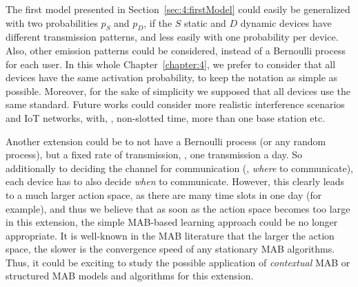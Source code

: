 The first model presented in Section~\ref{sec:4:firstModel} could easily be generalized with two probabilities $p_S$ and $p_D$, if the $S$ static and $D$ dynamic devices have different transmission patterns, and less easily with one probability per device.
Also, other emission patterns could be considered, instead of a Bernoulli process for each user.
In this whole Chapter~\ref{chapter:4}, we prefer to consider that all devices have the same activation probability, to keep the notation as simple as possible.
%
Moreover, for the sake of simplicity we supposed that all devices use the same standard.
Future works could consider more realistic interference scenarios and IoT networks, with, \eg, non-slotted time, more than one base station etc.

Another extension could be to not have a Bernoulli process (or any random process), but a fixed rate of transmission, \eg, one transmission a day.
So additionally to deciding the channel for communication (\ie, \emph{where} to communicate), each device has to also decide \emph{when} to communicate.
However, this clearly leads to a much larger action space, as there are many time slots in one day (for example), and thus we believe that as soon as the action space becomes too large in this extension, the simple MAB-based learning approach could be no longer appropriate.
It is well-known in the MAB literature that the larger the action space, the slower is the convergence speed of any stationary MAB algorithms.
Thus, it could be exciting to study the possible application of \emph{contextual} MAB \cite{Li10,Luo18} or structured MAB \cite{Combes17} models and algorithms for this extension.





